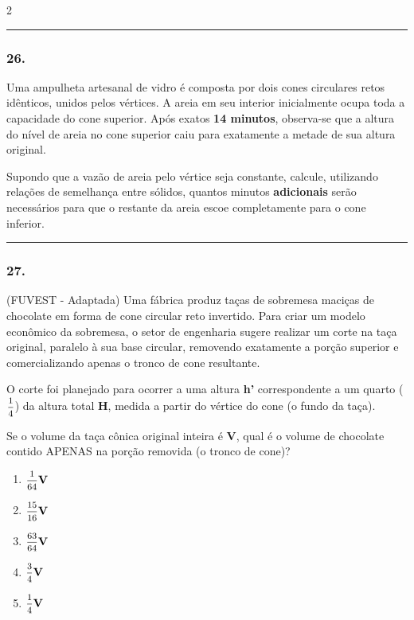\documentclass[twoside, 10pt, a4paper]{article}
\newlength{\espacoPreQuestao}\setlength{\espacoPreQuestao}{0.1cm}
\newlength{\espacoQuestao}\setlength{\espacoQuestao}{0.2cm}
\newlength{\espacoAlt}\setlength{\espacoAlt}{0.2cm}
\begin{document}
\begin{multicols*}{2}
\noindent\textcolor{CorLinha}{\rule{\linewidth}{0.5pt}} 
\par\vspace{\espacoPreQuestao}
\subsubsection*{26.} Uma ampulheta artesanal de vidro é composta por dois cones circulares retos idênticos, unidos pelos vértices. A areia em seu interior inicialmente ocupa toda a capacidade do cone superior. Após exatos \textbf{14 minutos}, observa-se que a altura do nível de areia no cone superior caiu para exatamente a metade de sua altura original. 

Supondo que a vazão de areia pelo vértice seja constante, calcule, utilizando relações de semelhança entre sólidos, quantos minutos \textbf{adicionais} serão necessários para que o restante da areia escoe completamente para o cone inferior.
\par\vspace{\espacoQuestao}

\noindent\textcolor{CorLinha}{\rule{\linewidth}{0.5pt}} 
\par\vspace{\espacoPreQuestao}
\subsubsection*{27.} (FUVEST - Adaptada) Uma fábrica produz taças de sobremesa maciças de chocolate em forma de cone circular reto invertido. Para criar um modelo econômico da sobremesa, o setor de engenharia sugere realizar um corte na taça original, paralelo à sua base circular, removendo exatamente a porção superior e comercializando apenas o tronco de cone resultante. 

O corte foi planejado para ocorrer a uma altura \textbf{h'} correspondente a um quarto ($ \mfrac{1}{4} $) da altura total \textbf{H}, medida a partir do vértice do cone (o fundo da taça).

Se o volume da taça cônica original inteira é \textbf{V}, qual é o volume de chocolate contido APENAS na porção removida (o tronco de cone)?

\begin{enumerate}[label=\alph*), itemsep=\espacoAlt]
\item $ \mfrac{1}{64} \textbf{V} $
\item $ \mfrac{15}{16} \textbf{V} $
\item $ \mfrac{63}{64} \textbf{V} $
\item $ \mfrac{3}{4} \textbf{V} $
\item $ \mfrac{1}{4} \textbf{V} $
\end{enumerate}
\par\vspace{\espacoQuestao}


\end{multicols*}
\end{document}

